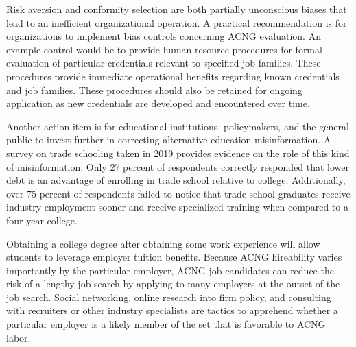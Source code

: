 \documentclass[review]{elsarticle}
\begin{document}
Risk aversion and conformity selection are both partially unconscious biases that lead to an inefficient organizational operation.
A practical recommendation is for organizations to implement bias controls concerning ACNG evaluation.
An example control would be to provide human resource procedures for formal evaluation of particular credentials relevant to specified job families.
These procedures provide immediate operational benefits regarding known credentials and job families.
These procedures should also be retained for ongoing application as new credentials are developed and encountered over time.

Another action item is for educational institutions, policymakers, and the general public to invest further in correcting alternative education misinformation.
A survey on trade schooling taken in 2019 provides evidence on the role of this kind of misinformation\cite{arabia_2019}.
Only 27 percent of respondents correctly responded that lower debt is an advantage of enrolling in trade school relative to college.
Additionally, over 75 percent of respondents failed to notice that trade school graduates receive industry employment sooner
and receive specialized training when compared to a four-year college.

Obtaining a college degree after obtaining some work experience will allow students to leverage employer tuition benefits.
Because ACNG hireability varies importantly by the particular employer, ACNG job candidates can reduce the risk of a lengthy job search by applying to many employers at the outset of the job search.
Social networking, online research into firm policy, and consulting with recruiters or other industry specialists are tactics to apprehend whether a particular employer is a likely member of the set that is favorable to ACNG labor.

\end{document}
